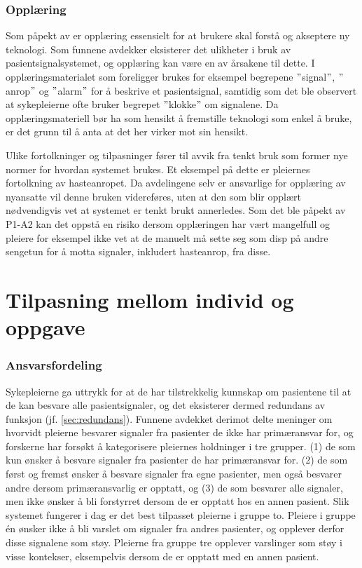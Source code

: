 \subsubsection{Opplæring}	 
Som påpekt av \citet{Venkatesh99} er opplæring essensielt for at brukere skal forstå og akseptere ny teknologi.	Som funnene avdekker eksisterer det ulikheter i bruk av pasientsignalsystemet, og opplæring kan være en av årsakene til dette. I opplæringsmaterialet som foreligger brukes for eksempel begrepene $"$signal$"$, $"$anrop$"$ og $"$alarm$"$ for å beskrive et pasientsignal, samtidig som det ble observert at sykepleierne ofte bruker begrepet $"$klokke$"$ om signalene. Da opplæringsmateriell bør ha som hensikt å fremstille teknologi som enkel å bruke, er det grunn til å anta at det her virker mot sin hensikt.

\noindent
Ulike fortolkninger og tilpasninger fører til avvik fra tenkt bruk som former nye normer for hvordan systemet brukes. Et eksempel på dette er pleiernes fortolkning av hasteanropet. Da avdelingene selv er ansvarlige for opplæring av nyansatte vil denne bruken videreføres, uten at den som blir opplært nødvendigvis vet at systemet er tenkt brukt annerledes. Som det ble påpekt av P1-A2 kan det oppstå en risiko dersom opplæringen har vært mangelfull og pleiere for eksempel ikke vet at de manuelt må sette seg som disp på andre sengetun for å motta signaler, inkludert hasteanrop, fra disse.

\section{Tilpasning mellom individ og oppgave}

\subsubsection{Ansvarsfordeling}
Sykepleierne ga uttrykk for at de har tilstrekkelig kunnskap om pasientene til at de kan besvare alle pasientsignaler, og det eksisterer dermed redundans av funksjon (jf. \ref{sec:redundans}). Funnene avdekket derimot delte meninger om hvorvidt pleierne besvarer signaler fra pasienter de ikke har primæransvar for, og forskerne har forsøkt å kategorisere pleiernes holdninger i tre grupper. (1) de som kun ønsker å besvare signaler fra pasienter de har primæransvar for. (2) de som  først og fremst ønsker å besvare signaler fra egne pasienter, men også besvarer andre dersom primæransvarlig er opptatt, og (3) de som besvarer alle signaler, men ikke ønsker å bli forstyrret dersom de er opptatt hos en annen pasient. Slik systemet fungerer i dag er det best tilpasset pleierne i gruppe to. Pleiere i gruppe én ønsker ikke å bli varslet om signaler fra andres pasienter, og opplever derfor disse signalene som støy. Pleierne fra gruppe tre opplever varslinger som støy i visse kontekser, eksempelvis dersom de er opptatt med en annen pasient.


